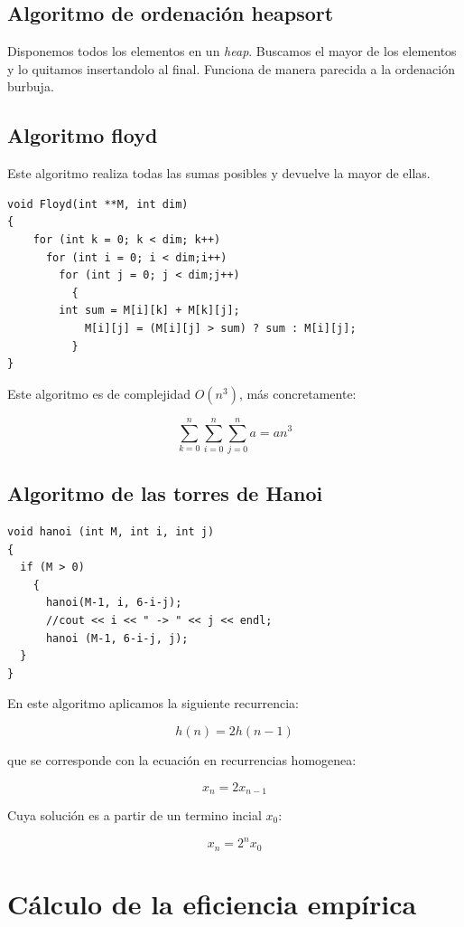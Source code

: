 \documentclass{article}
\begin{document}
\subsection{Algoritmo de ordenación heapsort}

Disponemos todos los elementos en un \textit{heap}. Buscamos el mayor
de los elementos y lo quitamos insertandolo al final. Funciona de
manera parecida a la ordenación burbuja.

\subsection{Algoritmo floyd}

Este algoritmo realiza todas las sumas posibles y devuelve la mayor de
ellas.

\begin{lstlisting}
void Floyd(int **M, int dim)
{
	for (int k = 0; k < dim; k++)
	  for (int i = 0; i < dim;i++)
	    for (int j = 0; j < dim;j++)
	      {
		int sum = M[i][k] + M[k][j];    	
	    	M[i][j] = (M[i][j] > sum) ? sum : M[i][j];
	      }
}
\end{lstlisting}

Este algoritmo es de complejidad $O(n^3)$, más concretamente:

$$\sum_{k=0}^{n}{\sum_{i=0}^{n}{\sum_{j=0}^n{a}}} = an^3$$

\subsection{Algoritmo de las torres de Hanoi}

\begin{lstlisting}
void hanoi (int M, int i, int j)
{
  if (M > 0)
    {
      hanoi(M-1, i, 6-i-j);
      //cout << i << " -> " << j << endl;
      hanoi (M-1, 6-i-j, j);
  }
}
\end{lstlisting}

En este algoritmo aplicamos la siguiente recurrencia:

$$h(n) = 2h(n-1)$$

que se corresponde con la ecuación en recurrencias homogenea:

$$x_n = 2x_{n-1}$$

Cuya solución es a partir de un termino incial $x_0$:

$$x_n = 2^nx_0$$

\section{Cálculo de la eficiencia empírica}
\end{document}
